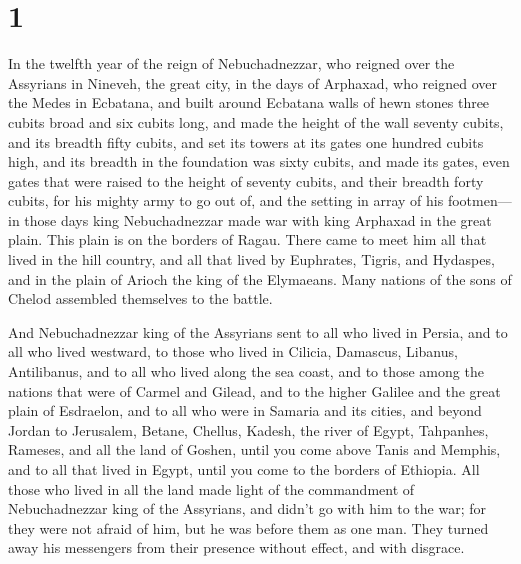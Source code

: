\hypertarget{section}{%
\section{1}\label{section}}

 In the twelfth year of the reign of Nebuchadnezzar, who
reigned over the Assyrians in Nineveh, the great city, in the days of
Arphaxad, who reigned over the Medes in Ecbatana,  and built
around Ecbatana walls of hewn stones three cubits broad and six cubits
long, and made the height of the wall seventy cubits, and its breadth
fifty cubits,  and set its towers at its gates one hundred
cubits high, and its breadth in the foundation was sixty cubits,
 and made its gates, even gates that were raised to the
height of seventy cubits, and their breadth forty cubits, for his mighty
army to go out of, and the setting in array of his footmen---
 in those days king Nebuchadnezzar made war with king
Arphaxad in the great plain. This plain is on the borders of Ragau.
 There came to meet him all that lived in the hill country,
and all that lived by Euphrates, Tigris, and Hydaspes, and in the plain
of Arioch the king of the Elymaeans. Many nations of the sons of Chelod
assembled themselves to the battle.

 And Nebuchadnezzar king of the Assyrians sent to all who
lived in Persia, and to all who lived westward, to those who lived in
Cilicia, Damascus, Libanus, Antilibanus, and to all who lived along the
sea coast,  and to those among the nations that were of
Carmel and Gilead, and to the higher Galilee and the great plain of
Esdraelon,  and to all who were in Samaria and its cities,
and beyond Jordan to Jerusalem, Betane, Chellus, Kadesh, the river of
Egypt, Tahpanhes, Rameses, and all the land of Goshen, 
until you come above Tanis and Memphis, and to all that lived in Egypt,
until you come to the borders of Ethiopia.  All those who
lived in all the land made light of the commandment of Nebuchadnezzar
king of the Assyrians, and didn't go with him to the war; for they were
not afraid of him, but he was before them as one man. They turned away
his messengers from their presence without effect, and with disgrace.

